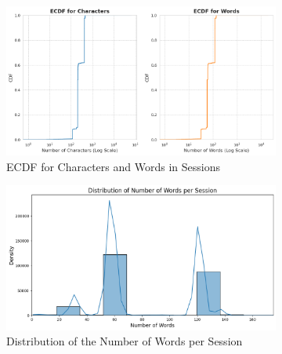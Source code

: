         \begin{figure}[h]
            \centering
            \begin{subfigure}[b]{0.47\textwidth}
                \centering
                \includegraphics[width=\textwidth]{../figures/plots/section1/ecdf_for_characters_and_for_words.png}
                \caption{ECDF for Characters and Words in Sessions}
                \label{fig:ecdf_sessions}
            \end{subfigure}
            \hfill
            \begin{subfigure}[b]{0.47\textwidth}
                \centering
                \includegraphics[width=\textwidth]{../figures/plots/section1/distribution_of_number_of_words_per_session_limited.png}
                \caption{Distribution of the Number of Words per Session}
                \label{fig:word_distribution}
            \end{subfigure}
            \caption{}
            \label{fig:}
        \end{figure}


